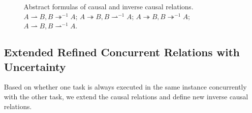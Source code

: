 \documentclass{llncs}
\begin{document}
\begin{figure}[htb]
{\begin{minipage}[b]{0.45\textwidth}
	\end{minipage}
	\label{fig:causalCaseB}
}
\caption{Abstract formulas of causal and inverse causal relations.  $A\rightharpoonup B, B\twoheadrightarrow^{-1}A$;  $A\twoheadrightarrow B, B\rightharpoonup^{-1}A$;  $A\twoheadrightarrow B, B\twoheadrightarrow^{-1}A$;  $A\rightharpoonup B, B\rightharpoonup^{-1}A$.}
\label{fig:causalCases}
\end{figure}

\subsection{Extended Refined Concurrent Relations with Uncertainty}\label{subsec:concurrent}
Based on whether one task is always executed in the same instance concurrently with the other task, we extend the causal relations and define new inverse causal relations.

\begin{definition}\label{def:alwaysConcurrent}
\end{definition}
\end{document}
